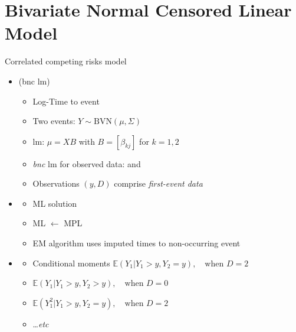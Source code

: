 \documentclass[10pt]{beamer}
\newcommand{\nologo}{\setbeamertemplate{logo}{}}
\begin{document}
  
 

\section{Bivariate Normal Censored Linear Model}

\begin{frame}{Correlated competing risks model}
  \begin{itemize}
  \item
    {\color{DarkBlue}{Bivariate Normal Censored Linear Model}} (bnc lm)
    \begin{itemize}
    \item
      Log-Time to {} event
    \item
      Two events: $Y \sim \mbox{BVN}(\mu,\Sigma) $
    \item
      lm: $\mu = X B$ with $B=\left[ \beta_{kj} \right]$ for $k=1,2$
    \item
      \emph{bnc} lm for observed data: \color{red}{$y=\min (Y_1, Y_2, C)$} and  \color{red}{$D=1,2,0$}
    \item Observations $(y,D)$ comprise \emph{first-event data} 
    \end{itemize}
  \item
    {\color{DarkBlue}{Estimation}}
    \begin{itemize}
    \item ML solution 
    \item
      ML $\leftarrow$  MPL
    \item
      EM algorithm uses imputed times to non-occurring event
    \end{itemize}
  \item 
   {\color{DarkBlue}{Imputation}}
    \begin{itemize}
    \item Conditional moments
      \( \mathbb{E} (Y_1| Y_1 > y, Y_2=y), \quad \mbox{when } D=2\)
    \item
      \( \mathbb{E} (Y_1| Y_1 > y, Y_2 > y), \quad \mbox{when } D=0 \)
    \item 
    \( \mathbb{E} (Y_1^2| Y_1> y, Y_2=y), \quad \mbox{when } D=2 \) 
    \item
    \ldots \emph{etc}
    \end{itemize}
  \end{itemize}
\end{frame}
\end{document}

